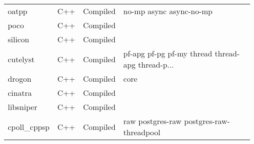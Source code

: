 \begin{longtable}{llll}
    oatpp            & C++         & Compiled    & no-mp async async-no-mp                            \\
    poco             & C++         & Compiled    &                                                    \\
    silicon          & C++         & Compiled    &                                                    \\
    cutelyst         & C++         & Compiled    & pf-apg pf-pg pf-my thread thread-apg thread-p...   \\
    drogon           & C++         & Compiled    & core                                               \\
    cinatra          & C++         & Compiled    &                                                    \\
    libsniper        & C++         & Compiled    &                                                    \\
    cpoll\_cppsp     & C++         & Compiled    & raw postgres-raw postgres-raw-threadpool           \\
\end{longtable}

